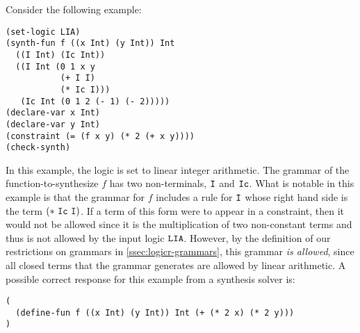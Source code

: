 \documentclass[english,a4paper,10pt]{article}
\begin{document}

\begin{example}
Consider the following example:
\begin{lstlisting}[language=SyGuS]
(set-logic LIA)
(synth-fun f ((x Int) (y Int)) Int
  ((I Int) (Ic Int))
  ((I Int (0 1 x y
           (+ I I)
           (* Ic I)))
   (Ic Int (0 1 2 (- 1) (- 2)))))
(declare-var x Int)
(declare-var y Int)
(constraint (= (f x y) (* 2 (+ x y))))
(check-synth)
\end{lstlisting}
In this example, the logic is set 
to linear integer arithmetic.
The grammar of the function-to-synthesize $f$
has two non-terminals, ${\tt I}$ and ${\tt Ic}$.
What is notable in this example is that
the grammar for $f$ includes a rule for ${\tt I}$ whose right hand side 
is the term ${\tt(*\ Ic\ I)}$. 
If a term of this form were to appear
in a constraint, 
then it would not be allowed since it is the
multiplication of two non-constant terms and thus is not allowed by the input logic ${\tt LIA}$.
However, 
by the definition of our restrictions on grammars in \cref{ssec:logicr-grammars},
this grammar \emph{is allowed},
since all closed terms that the grammar generates are allowed by linear arithmetic.
A possible correct response for this example from a synthesis solver is:
\begin{lstlisting}[language=SyGuS]
(
  (define-fun f ((x Int) (y Int)) Int (+ (* 2 x) (* 2 y)))
)
\end{lstlisting}
\end{example}
\end{document}
